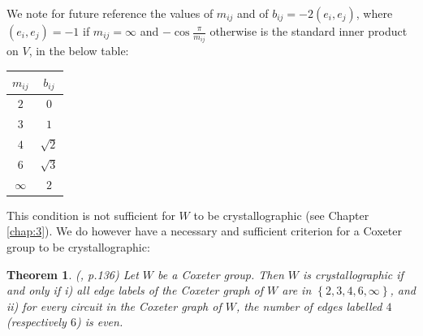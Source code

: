 \documentclass[11pt,a4paper]{report}
\newtheorem{theorem}{Theorem}[chapter]
\theoremstyle{definition}
\begin{document}
We note for future reference the values of $m_{ij}$ and of $b_{ij} = -2(e_i, e_j)$, where $(e_i, e_j) = -1$ if $m_{ij} = \infty$ and $-\cos \frac{\pi}{m_{ij}}$ otherwise is the standard inner product on $V$, in the below table:

\begin{center}
\begin{tabular}{|c|c| }
 \hline
 $m_{ij}$ & $b_{ij}$\\
 \hline
 $2$ & $0$\\
 \hline
 $3$ & $1$\\
 \hline
 $4$ & $\sqrt{2}$\\
 \hline
 $6$ & $\sqrt{3}$\\
 \hline
 $\infty$ & $2$\\
 \hline
\end{tabular}
\end{center}

This condition is not sufficient for $W$ to be crystallographic (see Chapter \ref{chap:3}). We do however have a necessary and sufficient criterion for a Coxeter group to be crystallographic:

\begin{theorem} \label{thm:crystalcond} (\cite{Humphreys}, p.136) Let $W$ be a Coxeter group. Then $W$ is crystallographic if and only if i) all edge labels of the Coxeter graph of $W$ are in $\left\{2,3,4,6,\infty\right\}$, and ii) for every circuit in the Coxeter graph of $W$, the number of edges labelled $4$ (respectively $6$) is even.\end{theorem}
\end{document}
